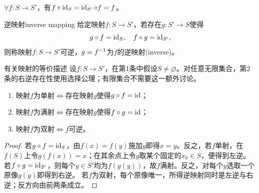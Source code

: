 \begin{corollary}
	$\forall f:S \to S'$，有$f \circ \operatorname{id}_S = \operatorname{id}_{S'} \circ f = f$。
\end{corollary}

\begin{definition}
	{逆映射}{inverse mapping}
	给定映射$f:S \to S'$，若存在$g:S' \to S$使得
	\begin{equation}\label{eq:la-inverse-map}
		g \circ f = \operatorname{id}_S,\quad f \circ g = \operatorname{id}_{S'},
	\end{equation}
	则称映射$f:S \to S'$可逆，$g = f^{-1}$为$f$的逆映射(inverse)。
\end{definition}
\begin{theorem}{有关映射的等价描述}{}
	设$f:S \to S'$，在第1条中假设$S \neq \varnothing$。对任意无限集合，第2条的右逆存在性使用选择公理；有限集合不需要这一额外讨论。
	\begin{enumerate}
		\item 映射$f$为单射$\iff$存在映射$g$使得$g \circ f = \operatorname{id}$；
		\item 映射$f$为满射$\iff$存在映射$g$使得$f \circ g = \operatorname{id}$；
		\item 映射$f$为双射$\iff f$可逆。
	\end{enumerate}
\end{theorem}
\begin{proof}
    若$g \circ f = \operatorname{id}_S$，由$f(x) = f(y)$施加$g$即得$x = y$。反之，若$f$单射，在$f(S)$上令$g(f(x)) = x$；在其余点上令$g$取某个固定的$x_0 \in S$，便得到左逆。
    若$f \circ g = \operatorname{id}_{S'}$，则每个$y \in S'$均为$f(g(y))$，故$f$满射。反之，对每个$y$选取一个原像$g(y)$即得到右逆。
    若$f$为双射，每个原像唯一，所得逆映射同时是左逆与右逆；反方向由前两条成立。
	
\end{proof}
